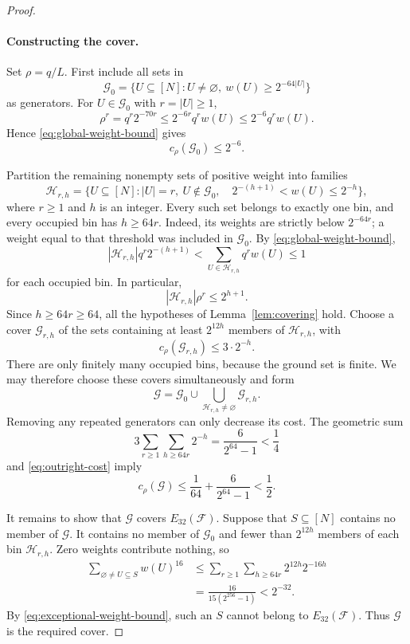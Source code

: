 \documentclass[11pt,letterpaper]{article}
\theoremstyle{definition}
\theoremstyle{remark}
\numberwithin{equation}{section}
\begin{document}
\begin{proof}
\paragraph{Constructing the cover.}
Set $\rho=q/L$. First include all sets in
\[
 \mathcal G_0=
 \{U\subseteq[N]:U\ne\varnothing,\ w(U)\ge2^{-64|U|}\}
\]
as generators. For $U\in\mathcal G_0$ with $r=|U|\ge1$,
\[
 \rho^r=q^r2^{-70r}
 \le2^{-6r}q^r w(U)
 \le2^{-6}q^r w(U).
\]
Hence \eqref{eq:global-weight-bound} gives
\begin{equation}\label{eq:outright-cost}
 c_\rho(\mathcal G_0)\le2^{-6}.
\end{equation}

Partition the remaining nonempty sets of positive weight into families
\[
 \mathcal H_{r,h}=
 \bigl\{U\subseteq[N]:|U|=r,\ U\notin\mathcal G_0,
 \quad 2^{-(h+1)}<w(U)\le2^{-h}\bigr\},
\]
where $r\ge1$ and $h$ is an integer. Every such set belongs to exactly
one bin, and every occupied bin has $h\ge64r$. Indeed, its weights are
strictly below $2^{-64r}$; a weight equal to that threshold was included
in $\mathcal G_0$. By \eqref{eq:global-weight-bound},
\[
 |\mathcal H_{r,h}|q^r2^{-(h+1)}
 <\sum_{U\in\mathcal H_{r,h}}q^r w(U)\le1
\]
for each occupied bin. In particular,
\[
 |\mathcal H_{r,h}|\rho^r\le2^{h+1}.
\]
Since $h\ge64r\ge64$, all the hypotheses of
Lemma~\ref{lem:covering} hold. Choose a cover $\mathcal G_{r,h}$ of
the sets containing at least $2^{12h}$ members of $\mathcal H_{r,h}$,
with
\[
 c_\rho(\mathcal G_{r,h})\le3\cdot2^{-h}.
\]
There are only finitely many occupied bins, because the ground set is
finite. We may therefore choose these covers simultaneously and form
\[
 \mathcal G=\mathcal G_0\cup\bigcup_{\mathcal H_{r,h}\ne\varnothing}
 \mathcal G_{r,h}.
\]
Removing any repeated generators can only decrease its cost. The
geometric sum
\begin{equation}\label{eq:bin-cost-sum}
 3\sum_{r\ge1}\sum_{h\ge64r}2^{-h}
 =\frac{6}{2^{64}-1}<\frac14
\end{equation}
and \eqref{eq:outright-cost} imply
\[
 c_\rho(\mathcal G)
 \le\frac1{64}+\frac{6}{2^{64}-1}<\frac12.
\]

It remains to show that $\mathcal G$ covers $E_{32}(\mathcal F)$.
Suppose that $S\subseteq[N]$ contains no member of $\mathcal G$.
It contains no member of $\mathcal G_0$ and fewer than $2^{12h}$
members of each bin $\mathcal H_{r,h}$. Zero weights contribute nothing,
so
\begin{equation}\label{eq:bin-power-sum}
 \begin{aligned}
 \sum_{\varnothing\ne U\subseteq S}w(U)^{16}
 &\le\sum_{r\ge1}\sum_{h\ge64r}2^{12h}2^{-16h}\\
 &=\frac{16}{15(2^{256}-1)}<2^{-32}.
 \end{aligned}
\end{equation}
By \eqref{eq:exceptional-weight-bound}, such an $S$ cannot belong to
$E_{32}(\mathcal F)$. Thus $\mathcal G$ is the required cover.
\end{proof}
\end{document}
